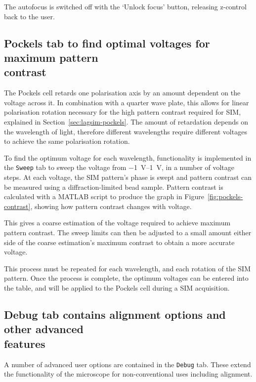 The autofocus is switched off with the `Unlock focus' button, releasing z-control back to the user.

\subsection[Pockels tab to find optimal voltages for maximum pattern contrast]{Pockels tab to find optimal voltages for maximum pattern\\ contrast}
The Pockels cell retards one polarisation axis by an amount dependent on the voltage across it.
In combination with a quarter wave plate, this allows for linear polarisation rotation necessary for the high pattern contrast required for SIM, explained in Section~\ref{sec:lagsim-pockels}.
The amount of retardation depends on the wavelength of light, therefore different wavelengths require different voltages to achieve the same polarisation rotation.

To find the optimum voltage for each wavelength, functionality is implemented in the \texttt{Sweep} tab to sweep the voltage from \SIrange{-1}{1}{\volt}, in a number of voltage steps.
At each voltage, the SIM pattern's phase is swept and pattern contrast can be measured using a diffraction-limited bead sample.
Pattern contrast is calculated with a MATLAB script to produce the graph in Figure~\ref{fig:pockels-contrast}, showing how pattern contrast changes with voltage.

This gives a coarse estimation of the voltage required to achieve maximum pattern contrast.
The sweep limits can then be adjusted to a small amount either side of the coarse estimation's maximum contrast to obtain a more accurate voltage.

This process must be repeated for each wavelength, and each rotation of the SIM pattern.
Once the process is complete, the optimum voltages can be entered into the table, and will be applied to the Pockels cell during a SIM acquisition.


\subsection[Debug tab contains alignment options and other advanced features]{Debug tab contains alignment options and other advanced\\ features}
A number of advanced user options are contained in the \texttt{Debug} tab.
These extend the functionality of the microscope for non-conventional uses including alignment.

